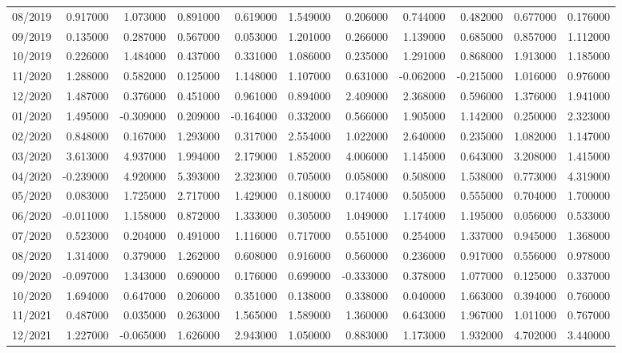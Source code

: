\begin{tabular}{lrrrrrrrrrr}
08/2019 & 0.917000 & 1.073000 & 0.891000 & 0.619000 & 1.549000 & 0.206000 & 0.744000 & 0.482000 & 0.677000 & 0.176000 \\
09/2019 & 0.135000 & 0.287000 & 0.567000 & 0.053000 & 1.201000 & 0.266000 & 1.139000 & 0.685000 & 0.857000 & 1.112000 \\
10/2019 & 0.226000 & 1.484000 & 0.437000 & 0.331000 & 1.086000 & 0.235000 & 1.291000 & 0.868000 & 1.913000 & 1.185000 \\
11/2020 & 1.288000 & 0.582000 & 0.125000 & 1.148000 & 1.107000 & 0.631000 & -0.062000 & -0.215000 & 1.016000 & 0.976000 \\
12/2020 & 1.487000 & 0.376000 & 0.451000 & 0.961000 & 0.894000 & 2.409000 & 2.368000 & 0.596000 & 1.376000 & 1.941000 \\
01/2020 & 1.495000 & -0.309000 & 0.209000 & -0.164000 & 0.332000 & 0.566000 & 1.905000 & 1.142000 & 0.250000 & 2.323000 \\
02/2020 & 0.848000 & 0.167000 & 1.293000 & 0.317000 & 2.554000 & 1.022000 & 2.640000 & 0.235000 & 1.082000 & 1.147000 \\
03/2020 & 3.613000 & 4.937000 & 1.994000 & 2.179000 & 1.852000 & 4.006000 & 1.145000 & 0.643000 & 3.208000 & 1.415000 \\
04/2020 & -0.239000 & 4.920000 & 5.393000 & 2.323000 & 0.705000 & 0.058000 & 0.508000 & 1.538000 & 0.773000 & 4.319000 \\
05/2020 & 0.083000 & 1.725000 & 2.717000 & 1.429000 & 0.180000 & 0.174000 & 0.505000 & 0.555000 & 0.704000 & 1.700000 \\
06/2020 & -0.011000 & 1.158000 & 0.872000 & 1.333000 & 0.305000 & 1.049000 & 1.174000 & 1.195000 & 0.056000 & 0.533000 \\
07/2020 & 0.523000 & 0.204000 & 0.491000 & 1.116000 & 0.717000 & 0.551000 & 0.254000 & 1.337000 & 0.945000 & 1.368000 \\
08/2020 & 1.314000 & 0.379000 & 1.262000 & 0.608000 & 0.916000 & 0.560000 & 0.236000 & 0.917000 & 0.556000 & 0.978000 \\
09/2020 & -0.097000 & 1.343000 & 0.690000 & 0.176000 & 0.699000 & -0.333000 & 0.378000 & 1.077000 & 0.125000 & 0.337000 \\
10/2020 & 1.694000 & 0.647000 & 0.206000 & 0.351000 & 0.138000 & 0.338000 & 0.040000 & 1.663000 & 0.394000 & 0.760000 \\
11/2021 & 0.487000 & 0.035000 & 0.263000 & 1.565000 & 1.589000 & 1.360000 & 0.643000 & 1.967000 & 1.011000 & 0.767000 \\
12/2021 & 1.227000 & -0.065000 & 1.626000 & 2.943000 & 1.050000 & 0.883000 & 1.173000 & 1.932000 & 4.702000 & 3.440000 \\

\end{tabular}
